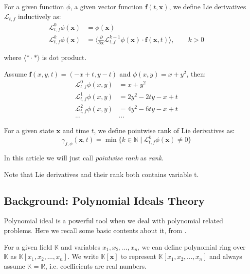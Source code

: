 \documentclass{jssc}
\begin{document}
\begin{definition}
\label{def:lieDeri}
For a given function $\phi$, a given vector function $\boldsymbol{f}(t, \boldsymbol{x})$, we define Lie derivatives $\mathcal{L}_{t, f}$ inductively as: 
\begin{align*}
	\mathcal{L}_{t, f}^0 \phi (\boldsymbol{x}) &= \phi (\boldsymbol{x}) \\
	\mathcal{L}_{t, f}^k \phi (\boldsymbol{x}) &= \langle \frac{\partial}{\partial \boldsymbol{x}} \mathcal{L}_{t, f}^{k-1} \phi (\boldsymbol{x}) \cdot  \boldsymbol{f}(\boldsymbol{x}, t) \rangle,\qquad k>0
\end{align*}

where $\langle * \cdot * \rangle$ is dot product.
\end{definition}

\begin{example}
	Assume $\boldsymbol{f}(x,y,t) = (-x+t,y-t)$ and $\phi (x,y) = x + y^2$, then: 
	\begin{align*}
		\mathcal{L}_{t, f}^0 \phi (x, y) &= x + y^2 \\
		\mathcal{L}_{t, f}^1 \phi (x, y) &= 2y^2 - 2ty -x + t \\
		\mathcal{L}_{t, f}^2 \phi (x, y) &= 4y^2 - 6ty -x + t \\
		\dots & \dots
	\end{align*}
\end{example}

\begin{definition}
\label{def:lieRank}
For a given state $\boldsymbol{x}$ and time $t$, we define pointwise rank of Lie derivatives as: 
\[
	\gamma_{f,\phi}(\boldsymbol{x}, t) = \min\{k \in \mathbb{N}\ |\ \mathcal{L}_{t, f}^k \phi (\boldsymbol{x}) \neq 0\}
\]
\end{definition}

In this article we will just call \emph{pointwise rank} as \emph{rank}.

Note that Lie derivatives and their rank both contains variable t.

\subsection{Background: Polynomial Ideals Theory}
Polynomial ideal is a powerful tool when we deal with polynomial related problems. Here we recall some basic contents about it, from \cite{cox1992ideals}.

For a given field $\mathbb{K}$ and variables $x_1, x_2, \dots, x_n$, we can define polynomial ring over $\mathbb{K}$ as $\mathbb{K}[x_1, x_2, \dots, x_n]$. We write $\mathbb{K}[\boldsymbol{x}]$ to represent $\mathbb{K}[x_1, x_2, \dots, x_n]$ and always assume $\mathbb{K} = \mathbb{R}$, i.e. coefficients are real numbers. 
\end{document}
